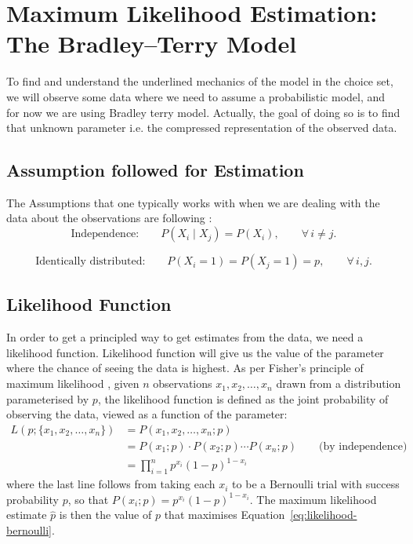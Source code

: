 \chapter{Maximum Likelihood Estimation: The Bradley--Terry Model}

To find and understand the underlined mechanics of the model in the choice set, we will observe some data where we need to  assume a probabilistic model, and for now we are using Bradley terry model.
Actually, the goal of doing so is to find that unknown parameter i.e. the compressed representation of the observed data.
\section{Assumption followed for Estimation}
The Assumptions that one typically works with when we are dealing with the data about the observations are following :
\[
\text{Independence:}\qquad P(X_i \mid X_j) = P(X_i), \qquad \forall\, i \neq j.
\]

\[
\text{Identically distributed:}\qquad P(X_i = 1) = P(X_j = 1) = p,
\qquad \forall\, i,j.
\]
\section{Likelihood Function}
In order to get a principled way to get estimates from the data, we need a likelihood function.
Likelihood function will give us the value of the parameter where the chance of seeing the data is highest.
As per Fisher's principle of maximum likelihood \citep{fisher1922mathematical}, given $n$
observations $x_1, x_2, \dots, x_n$ drawn from a distribution parameterised by $p$, the
likelihood function is defined as the joint probability of observing the data, viewed as a
function of the parameter:
\begin{align}
    L(p ; \{x_1, x_2, \dots, x_n\}) &= P(x_1, x_2, \dots, x_n ; p) \label{eq:likelihood-def} \\
    &= P(x_1 ; p) \cdot P(x_2 ; p) \cdots P(x_n ; p) \qquad \text{(by independence)} \label{eq:likelihood-product} \\
    &= \prod_{i=1}^{n} p^{x_i} (1-p)^{1-x_i} \label{eq:likelihood-bernoulli}
\end{align}
where the last line follows from taking each $x_i$ to be a Bernoulli trial with success
probability $p$, so that $P(x_i ; p) = p^{x_i}(1-p)^{1-x_i}$. The maximum likelihood estimate
$\hat{p}$ is then the value of $p$ that maximises Equation~\eqref{eq:likelihood-bernoulli}.

